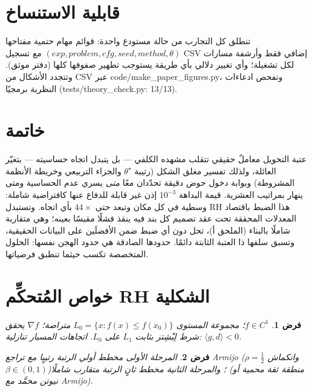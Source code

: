 ﻿\documentclass[12pt]{article}
\newtheorem{assumption}{فرض}
\newcommand{\en}[1]{\textenglish{\small #1}}
\newcommand{\thetastar}{\theta^{\star}}
\begin{document}
\section*{قابلية الاستنساخ}
تنطلق كل التجارب من حالة مستودع واحدة: قوائم مهام حتمية مفتاحها
$(exp, problem, cfg, seed, method, \theta)$ مع تسجيل CSV إضافي
فقط وأرشفة مسارات لكل تشغيلة؛ وأي تغيير دلالي بأي طريقة يستوجب تطهير
صفوفها كلها (دفتر موثق). وتتجدد الأشكال من CSV عبر
\en{code/make\_paper\_figures.py}، وتفحص ادعاءات النظرية برمجيًا
(\en{tests/theory\_check.py}: 13/13).

\section*{خاتمة}
عتبة التحويل معاملٌ حقيقي تتقلب مشهده الكلفي --- بل يتبدل اتجاه
حساسيته --- بتغيّر العائلة، ولذلك تفسير مغلق الشكل (رتيبة $\thetastar$
والجزاء التربيعي وخريطة الأنظمة المشروطة) وبوابة دخول حوض دقيقة
تحدّدان معًا \emph{متى} يسري عدم الحساسية ومتى ينهار بمراتيب
العشرية. قيمة البداهة $10^{-3}$ إذن غير قابلة للدفاع عنها كافتراضية
شاملة: وسطية في كل مكان وتبعد حتى $44\times$ بأي اتجاه. وتستبدل RH
هذا الضبط باقتصاد المعدلات المحققة تحت عقد تصميم كل بند فيه ينقذ فشلًا
مقيسًا بعينه؛ وهي متقاربة شاملًا بالبناء (الملحق أ)، تحل دون أي ضبط
ضمن الأفضلَين على البيانات الحقيقية، وتسبق سلفها ذا العتبة الثابتة
دائمًا. حدودها الصادقة هي حدود الهجن نفسها: الحلول المتخصصة تكسب حيثما
تنطبق فرضياتها.

\appendix
\section{خواص المُتحكِّم RH الشكلية}\label{app:proofs}

\begin{assumption}
$f\in C^1$؛ مجموعة المستوى $L_0=\{x: f(x)\le f(x_0)\}$ متراصة؛
$\nabla f$ يحقق شرط لِبْشِتز بثابت $L_1$ على $L_0$. اتجاهات المسبار
تنازلية: $\langle g,d\rangle<0$.
\end{assumption}
\begin{assumption}
المرحلة الأولى مخطط أولي الرتبة رتيبٍا مع تراجع Armijo
($\rho=\tfrac12$ وانكماش $\beta\in(0,1)$)؛ والمرحلة الثانية مخطط
ثانٍ الرتبة متقارب شاملًا (منطقة ثقة محمية أو نيوتن مخمَّد مع
Armijo).
\end{assumption}
\end{document}
